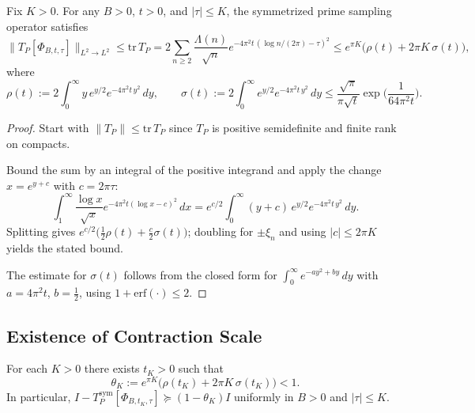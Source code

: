 \begin{lemma}\label{lem:shift-trace-cap}
Fix $K > 0$. For any $B > 0$, $t > 0$, and $|\tau| \leq K$, the symmetrized prime sampling operator satisfies
\begin{equation}\label{eq:shift-trace-bound}
  \|T_P[\Phi_{B,t,\tau}]\|_{L^2 \to L^2} \leq \mathrm{tr}\, T_P = 2 \sum_{n \geq 2} \frac{\Lambda(n)}{\sqrt{n}} e^{-4\pi^2 t \, (\log n/(2\pi) - \tau)^2} \leq e^{\pi K} \Big(\rho(t) + 2\pi K \, \sigma(t)\Big),
\end{equation}
where
\begin{equation}\label{eq:sigma-def}
  \rho(t) := 2 \int_0^\infty y \, e^{y/2} e^{-4\pi^2 t \, y^2} \, dy, \qquad \sigma(t) := 2 \int_0^\infty e^{y/2} e^{-4\pi^2 t \, y^2} \, dy \leq \frac{\sqrt{\pi}}{\pi\sqrt{t}} \exp\!\Big(\frac{1}{64\pi^2 t}\Big).
\end{equation}
\end{lemma}

\begin{proof}
Start with $\|T_P\| \leq \mathrm{tr}\, T_P$ since $T_P$ is positive semidefinite and finite rank on compacts.

Bound the sum by an integral of the positive integrand and apply the change $x = e^{y+c}$ with $c = 2\pi\tau$:
\begin{equation}
  \int_1^\infty \frac{\log x}{\sqrt{x}} e^{-4\pi^2 t(\log x - c)^2} \, dx = e^{c/2} \int_0^\infty (y+c) \, e^{y/2} e^{-4\pi^2 t \, y^2} \, dy.
\end{equation}
Splitting gives $e^{c/2}\big(\tfrac{1}{2}\rho(t) + \tfrac{c}{2}\sigma(t)\big)$; doubling for $\pm\xi_n$ and using $|c| \leq 2\pi K$ yields the stated bound.

The estimate for $\sigma(t)$ follows from the closed form for $\int_0^\infty e^{-ay^2+by} \, dy$ with $a = 4\pi^2 t$, $b = \tfrac{1}{2}$, using $1 + \mathrm{erf}(\cdot) \leq 2$.
\end{proof}

\subsection{Existence of Contraction Scale}

\begin{proposition}\label{prop:contraction-scale}
For each $K > 0$ there exists $t_K > 0$ such that
\begin{equation}
  \theta_K := e^{\pi K} \Big(\rho(t_K) + 2\pi K \, \sigma(t_K)\Big) < 1.
\end{equation}
In particular, $I - T_P^{\mathrm{sym}}[\Phi_{B,t_K,\tau}] \succeq (1 - \theta_K) I$ uniformly in $B > 0$ and $|\tau| \leq K$.
\end{proposition}

